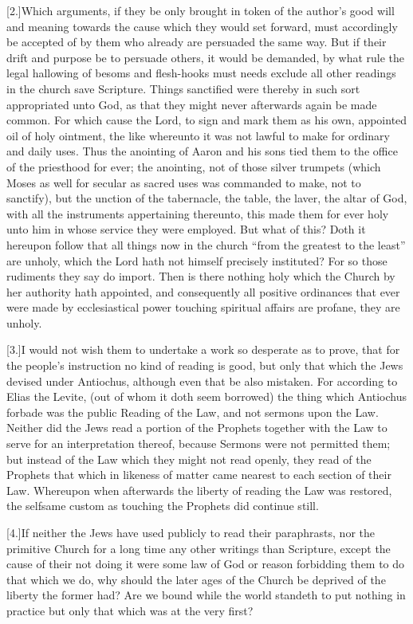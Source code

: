 [2.]Which arguments, if they be only brought in token of the author’s good will and meaning towards the cause which they would set forward, must accordingly be accepted of by them who already are persuaded the same way. But if their drift and purpose be to persuade others, it would be demanded,  by what rule the legal hallowing of besoms and flesh-hooks must needs exclude all other readings in the church save Scripture.
 Things sanctified were thereby in such sort appropriated unto God, as that they might never afterwards again be made common. For which cause the Lord, to sign and mark them as his own, appointed oil of holy ointment, the like whereunto it was not lawful to make for ordinary and daily uses. Thus the anointing of Aaron and his sons tied them to the office of the priesthood for ever; the anointing, not of those silver trumpets (which Moses as well for secular as sacred uses was commanded to make, not to sanctify), but the unction of the tabernacle, the table, the laver, the altar of God, with all the instruments appertaining thereunto, this made them for ever holy unto him in whose service they were employed. But what of this? Doth it hereupon follow that all things now in the church “from the greatest to the least” are unholy, which the Lord hath not himself precisely instituted? For so those rudiments they say do import. Then is there nothing holy which the Church by her authority hath appointed, and consequently all positive ordinances that ever were made by ecclesiastical power touching spiritual affairs are profane, they are unholy.

[3.]I would not wish them to undertake a work so desperate as to prove, that for the people’s instruction no kind of reading is good, but only that which the Jews devised under Antiochus, although even that be also mistaken. For according to Elias the Levite, (out of whom it doth seem borrowed)  the thing which Antiochus forbade was the public Reading of the Law, and not sermons upon the Law.
 Neither did the Jews read a portion of the Prophets together with the Law to serve for an interpretation thereof, because Sermons were not permitted them; but instead of the Law which they might not read openly, they read of the Prophets that which in likeness of matter came nearest to each section of their Law. Whereupon when afterwards the liberty of reading the Law was restored, the selfsame custom as touching the Prophets did continue still.

[4.]If neither the Jews have used publicly to read their paraphrasts, nor the primitive Church for a long time any other writings than Scripture, except the cause of their not doing it were some law of God or reason forbidding them to do that which we do, why should the later ages of the Church be deprived of the liberty the former had? Are we bound while the world standeth to put nothing in practice but only that which was at the very first?

